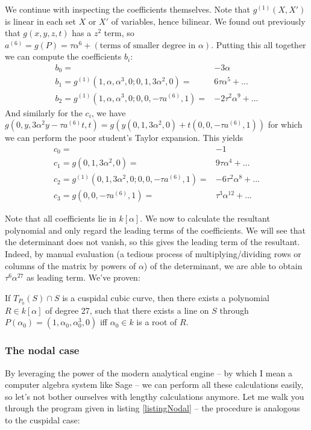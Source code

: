We continue with inspecting the coefficients themselves.
Note that $g^{(1)}(X,X')$ is linear in each set $X$ or $X'$ of variables, hence bilinear.
We found out previously that $g(x,y,z,t)$ has a $z^2$ term, so $a^{(6)} = g(P) = \tau\alpha^6 + (\text{terms of smaller degree in } \alpha)$.
Putting this all together we can compute the coefficients $b_i$:
\begin{align}
b_0 =& -3\alpha \\
b_1 = g^{(1)}(1,\alpha,\alpha^3,0;0,1,3\alpha^2,0) =& 6\tau\alpha^5 + ... \\
b_2 = g^{(1)}(1,\alpha,\alpha^3,0;0,0,-\tau a^{(6)},1) =& -2\tau^2\alpha^9 + ...
\end{align}
And similarly for the $c_i$, we have $g(0,y,3\alpha^2y-\tau a^{(6)}t,t) = g(y(0,1,3\alpha^2,0)+t(0,0,-\tau a^{(6)},1))$ for which we can perform the poor student's Taylor expansion. This yields
\begin{align}
c_0 =& -1\\
c_1 = g(0,1,3\alpha^2,0) =& 9\tau\alpha^4 + ... \\
c_2 = g^{(1)}(0,1,3\alpha^2,0;0,0,-\tau a^{(6)},1) =& -6\tau^2\alpha^8 + ... \\
c_3 = g(0,0,-\tau a^{(6)},1) =& \tau^3\alpha^{12} + ...
\end{align}

Note that all coefficients lie in $k[\alpha]$.
We now to calculate the resultant polynomial and only regard the leading terms of the coefficients.
We will see that the determinant does not vanish, so this gives the leading term of the resultant.
Indeed, by manual evaluation (a tedious process of multiplying/dividing rows or columns of the matrix by powers of $\alpha$) of the determinant, we are able to obtain $\tau^6\alpha^{27} $ as leading term.
We've proven:
\begin{proposition} \label{propositionExists1}
If $T_{P_0}(S) \cap S$ is a cuspidal cubic curve, then there exists a polynomial $R \in k[\alpha]$ of degree 27, such that there exists a line on $S$ through $P(\alpha_0) = (1,\alpha_0,\alpha_0^3,0)$ iff $\alpha_0 \in k$ is a root of $R$.
\end{proposition}

\subsubsection{The nodal case}
By leveraging the power of the modern analytical engine -- by which I mean a computer algebra system like Sage \cite{sagemath2014} -- we can perform all these calculations easily, so let's not bother ourselves with lengthy calculations anymore.
Let me walk you through the program given in listing \ref{listingNodal} -- the procedure is analogous to the cuspidal case:


